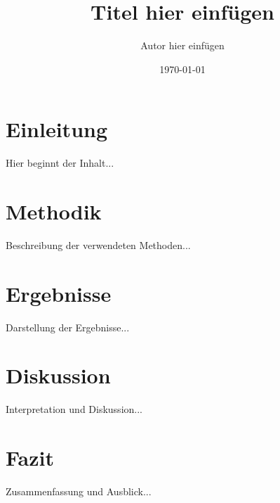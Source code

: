 \documentclass[12pt,a4paper]{article}
\title{Titel hier einfügen}
\author{Autor hier einfügen}
\date{\today}
\begin{document}
\maketitle
\newpage

\tableofcontents
\newpage

\section{Einleitung}

Hier beginnt der Inhalt...

\section{Methodik}

Beschreibung der verwendeten Methoden...

\section{Ergebnisse}

Darstellung der Ergebnisse...

\section{Diskussion}

Interpretation und Diskussion...

\section{Fazit}

Zusammenfassung und Ausblick...

\newpage
\printbibliography
\end{document}
